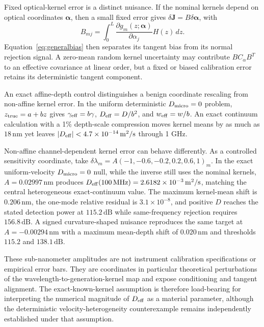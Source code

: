\documentclass[aps,pra,twocolumn,superscriptaddress,nofootinbib]{revtex4-2}
\begin{document}
Fixed optical-kernel error is a distinct nuisance. If the nominal kernels depend on optical coordinates $\bm\alpha$, then a small fixed error gives $\delta\bm J=B\delta\bm\alpha$, with
\begin{equation}
B_{mj}=\int_0^L\frac{\partial g_m(z;\bm\alpha)}{\partial\alpha_j}H(z)\,dz.
\end{equation}
Equation~\eqref{eq:generalbias} then separates its tangent bias from its normal rejection signal. A zero-mean random kernel uncertainty may contribute $BC_\alpha B^T$ to an effective covariance at linear order, but a fixed or biased calibration error retains its deterministic tangent component.

An exact affine-depth control distinguishes a benign coordinate rescaling from non-affine kernel error. In the uniform deterministic $D_{\rm micro}=0$ problem, $z_{\rm true}=a+bz$ gives $\gamma_{\rm eff}=b\gamma$, $D_{\rm eff}=D/b^2$, and $w_{\rm eff}=w/b$. An exact continuum calculation with a 1\% depth-scale compression moves kernel means by as much as $18\,\mathrm{nm}$ yet leaves $|D_{\rm eff}|<4.7\times10^{-14}\,\mathrm{m^2/s}$ through 1 GHz.

Non-affine channel-dependent kernel error can behave differently. As a controlled sensitivity coordinate, take $\delta\lambda_m=A(-1,-0.6,-0.2,0.2,0.6,1)_m$. In the exact uniform-velocity $D_{\rm micro}=0$ null, while the inverse still uses the nominal kernels, $A=0.02997\,\mathrm{nm}$ produces $D_{\rm eff}(100\,\mathrm{MHz})=2.6182\times10^{-3}\,\mathrm{m^2/s}$, matching the central heterogeneous exact-continuum value. The maximum kernel-mean shift is $0.206\,\mathrm{nm}$, the one-mode relative residual is $3.1\times10^{-8}$, and positive $D$ reaches the stated detection power at $115.2\,\mathrm{dB}$ while same-frequency rejection requires $156.8\,\mathrm{dB}$. A signed curvature-shaped nuisance reproduces the same target at $A=-0.00294\,\mathrm{nm}$ with a maximum mean-depth shift of $0.020\,\mathrm{nm}$ and thresholds $115.2$ and $138.1\,\mathrm{dB}$.

These sub-nanometer amplitudes are not instrument calibration specifications or empirical error bars. They are coordinates in particular theoretical perturbations of the wavelength-to-generation-kernel map and expose conditioning and tangent alignment. The exact-known-kernel assumption is therefore load-bearing for interpreting the numerical magnitude of $D_{\rm eff}$ as a material parameter, although the deterministic velocity-heterogeneity counterexample remains independently established under that assumption.
\end{document}
